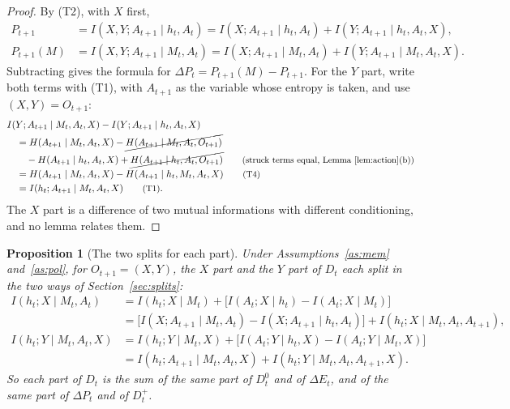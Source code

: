 \documentclass{article}
\newtheorem{proposition}{Proposition}[section]
\theoremstyle{definition}
\theoremstyle{remark}
\newcommand{\dE}{\Delta E}
\newcommand{\dP}{\Delta P}
\newcommand{\why}[1]{\tag*{\small(#1)}}
\begin{document}
\begin{proof}
By (T2), with $X$ first,
\begin{align*}
P_{t+1}&=I(X,Y;A_{t+1}\mid h_t,A_t)=I(X;A_{t+1}\mid h_t,A_t)+I(Y;A_{t+1}\mid h_t,A_t,X),\\
P_{t+1}(M)&=I(X,Y;A_{t+1}\mid M_t,A_t)=I(X;A_{t+1}\mid M_t,A_t)+I(Y;A_{t+1}\mid M_t,A_t,X).
\end{align*}
Subtracting gives the formula for $\dP_t=P_{t+1}(M)-P_{t+1}$. For the $Y$ part, write both terms with (T1), with $A_{t+1}$ as the variable whose entropy is taken, and use $(X,Y)=O_{t+1}$:
\begin{align*}
&I(Y;A_{t+1}\mid M_t,A_t,X)-I(Y;A_{t+1}\mid h_t,A_t,X)\\
&\quad=H(A_{t+1}\mid M_t,A_t,X)-\cancel{H(A_{t+1}\mid M_t,A_t,O_{t+1})}\\
&\qquad-H(A_{t+1}\mid h_t,A_t,X)+\cancel{H(A_{t+1}\mid h_t,A_t,O_{t+1})} \why{struck terms equal, Lemma~\ref{lem:action}(b)}\\
&\quad=H(A_{t+1}\mid M_t,A_t,X)-H(A_{t+1}\mid h_t,M_t,A_t,X) \why{T4}\\
&\quad=I(h_t;A_{t+1}\mid M_t,A_t,X) \why{T1}.
\end{align*}
The $X$ part is a difference of two mutual informations with different conditioning, and no lemma relates them.
\end{proof}

\begin{proposition}[The two splits for each part]\label{prop:xy-splits}
Under Assumptions~\ref{as:mem} and~\ref{as:pol}, for $O_{t+1}=(X,Y)$, the $X$ part and the $Y$ part of $D_t$ each split in the two ways of Section~\ref{sec:splits}:
\begin{align*}
I(h_t;X\mid M_t,A_t)&=I(h_t;X\mid M_t)+\big[I(A_t;X\mid h_t)-I(A_t;X\mid M_t)\big] \tag*{\small first split}\\
&=\big[I(X;A_{t+1}\mid M_t,A_t)-I(X;A_{t+1}\mid h_t,A_t)\big]+I(h_t;X\mid M_t,A_t,A_{t+1}) \tag*{\small second split},\\[4pt]
I(h_t;Y\mid M_t,A_t,X)&=I(h_t;Y\mid M_t,X)+\big[I(A_t;Y\mid h_t,X)-I(A_t;Y\mid M_t,X)\big] \tag*{\small first split}\\
&=I(h_t;A_{t+1}\mid M_t,A_t,X)+I(h_t;Y\mid M_t,A_t,A_{t+1},X) \tag*{\small second split}.
\end{align*}
So each part of $D_t$ is the sum of the same part of $D^0_t$ and of $\dE_t$, and of the same part of $\dP_t$ and of $D^+_t$.
\end{proposition}
\end{document}
